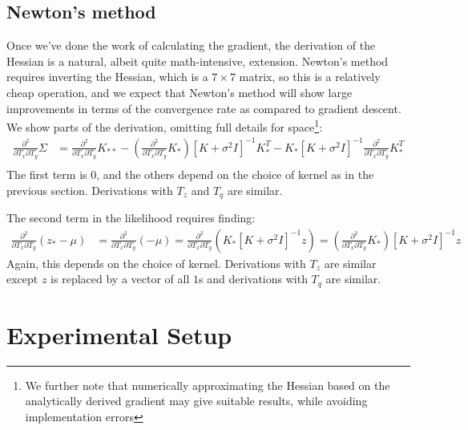 \documentclass{article} %
\begin{document}
\subsection{Newton's method}
\label{sec:newton}
Once we've done the work of calculating the gradient, the derivation of the Hessian is a natural, albeit quite math-intensive, extension. Newton's method requires inverting the Hessian, which is a $7 \times 7$ matrix, so this is a relatively cheap operation, and we expect that Newton's method will show large improvements in terms of the convergence rate as compared to gradient descent. We show parts of the derivation, omitting full details for space\footnote{We further note that numerically approximating the Hessian based on the analytically derived gradient may give suitable results, while avoiding implementation errors}:
\begin{align*}
\frac{\partial^2 }{\partial T_x \partial T_y} \Sigma &= \frac{\partial^2}{\partial T_x \partial T_y} K_{**} - \left(\frac{\partial^2}{\partial T_x \partial T_y}K_{*}\right) [K + \sigma^2 I]^{-1} K_*^T - K_{*} [K + \sigma^2 I]^{-1} \frac{\partial^2}{\partial T_x \partial T_y} K_*^T \\
\end{align*}
The first term is 0, and the others depend on the choice of kernel as in the previous section. Derivations with $T_z$ and $T_q$ are similar.

The second term in the likelihood requires finding:
\begin{align*}
\frac{\partial^2 }{\partial T_x \partial T_y} (z_* - \mu) &= \frac{\partial^2 }{\partial T_x \partial T_y} (- \mu) 
= \frac{\partial^2 }{\partial T_x \partial T_y}( K_* [K+\sigma^2 I]^{-1} z)
= (\frac{\partial^2 }{\partial T_x \partial T_y} K_*) [K+\sigma^2 I]^{-1} z
\end{align*}
Again, this depends on the choice of kernel. Derivations with $T_z$ are similar except $z$ is replaced by a vector of all $1$s and derivations with $T_q$ are similar.




\section{Experimental Setup}
\end{document}
